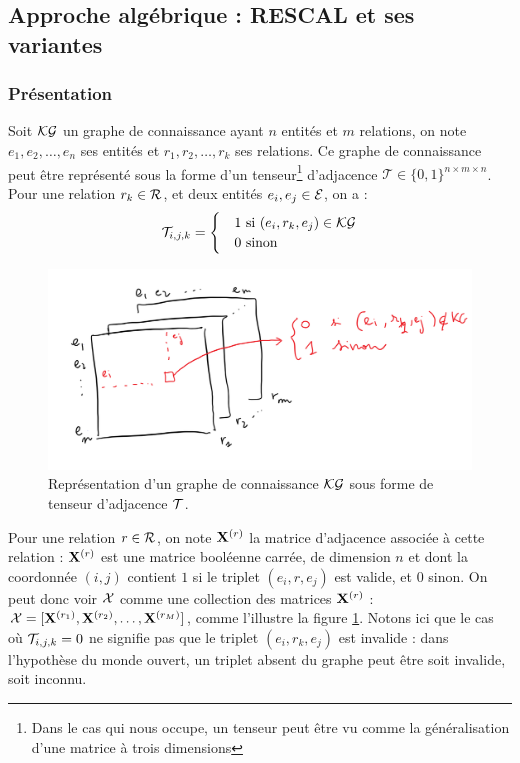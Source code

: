 \subsection{Approche algébrique : RESCAL et ses variantes}
\label{subsec:kge-models-mult}

\subsubsection{Présentation}


Soit $\KG$ un graphe de connaissance ayant $n$ entités et $m$ relations, on note $e_1, e_2, \ldots, e_n$ ses entités et $r_1, r_2, \ldots, r_k$ ses relations. Ce graphe de connaissance peut être représenté sous la forme d'un tenseur\footnote{Dans le cas qui nous occupe, un tenseur peut être vu comme la généralisation d'une matrice à trois dimensions} d'adjacence $\mathcal{T} \in \{0, 1\}^{n \times m \times n}$. Pour une relation $r_k \in \Rel$, et deux entités $e_i, e_j \in \Ent$, on a :
\begin{equation}
    \cal{T}_{i, j, k} = \begin{cases}
    &1 \text{ si } (e_i, r_k, e_j) \in \KG \\
    &0 \text{ sinon}
    \end{cases}
\end{equation}

\begin{figure}
    \centering
    \includegraphics[width=\textwidth]{img/tenseur_adjacence.png}
    \caption{Représentation d'un graphe de connaissance $\KG$ sous forme de tenseur d'adjacence $\cal{T}$.}
    \label{fig:kge-algebric-overview}
\end{figure}

Pour une relation $r \in \Rel$, on note $\bf{X}^{(r)}$ la matrice d'adjacence associée à cette relation : $\bf{X}^{(r)}$ est une matrice booléenne carrée, de dimension $n$ et dont la coordonnée $(i, j)$ contient $1$ si le triplet $(e_i, r, e_j)$ est valide, et $0$ sinon. On peut donc voir $\cal{X}$ comme une collection des matrices $\bf{X}^{(r)}$ : $\cal{X} = [\bf{X}^{(r_1)}, \bf{X}^{(r_2)}, \ldots, \bf{X}^{(r_M)}]$, comme l'illustre la figure  \ref{fig:kge-algebric-overview}. Notons ici que le cas où $\cal{T}_{i, j, k} = 0$ ne signifie pas que le triplet $(e_i, r_k, e_j)$ est invalide : dans l'hypothèse du monde ouvert, un triplet absent du graphe peut être soit invalide, soit inconnu.

